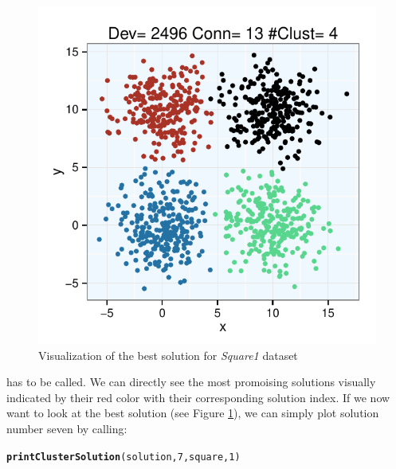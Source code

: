 \documentclass[parskip=half,DIV=14]{scrartcl}\usepackage[]{graphicx}\usepackage[]{color}
\makeatletter
\def\maxwidth{ %
  \ifdim\Gin@nat@width>\linewidth
    \linewidth
  \else
    \Gin@nat@width
  \fi
}
\newcommand{\hlnum}[1]{\textcolor[rgb]{0.686,0.059,0.569}{#1}}%
\newcommand{\hlstd}[1]{\textcolor[rgb]{0.345,0.345,0.345}{#1}}%
\newcommand{\hlkwd}[1]{\textcolor[rgb]{0.737,0.353,0.396}{\textbf{#1}}}%
\newenvironment{kframe}{%
 \def\at@end@of@kframe{}%
 \ifinner\ifhmode%
  \def\at@end@of@kframe{\end{minipage}}%
  \begin{minipage}{\columnwidth}%
 \fi\fi%
 \def\FrameCommand##1{\hskip\@totalleftmargin \hskip-\fboxsep
 \colorbox{shadecolor}{##1}\hskip-\fboxsep
     \hskip-\linewidth \hskip-\@totalleftmargin \hskip\columnwidth}%
 \MakeFramed {\advance\hsize-\width
   \@totalleftmargin\z@ \linewidth\hsize
   \@setminipage}}%
 {\par\unskip\endMakeFramed%
 \at@end@of@kframe}
\newenvironment{knitrout}{}{} %
\makeatother
\begin{document}
\begin{figure}
\begin{center}
\begin{knitrout}
\color{fgcolor}

{\centering \includegraphics[width=\maxwidth]{figures/plots-clusterSolutions-1} 

}



\end{knitrout}
\caption{Visualization of the best solution for \textit{Square1} dataset}
\label{fig:best}
\end{center}
\end{figure}
has to be called. We can directly see the most promoising solutions visually indicated by their red color with their corresponding solution index. If we now want to look at the best solution (see Figure \ref{fig:best}), we can simply plot solution number seven by calling:
\begin{knitrout}
\color{fgcolor}\begin{kframe}
\begin{alltt}
\hlkwd{printClusterSolution}\hlstd{(solution,}\hlnum{7}\hlstd{,square,}\hlnum{1}\hlstd{)}
\end{alltt}
\end{kframe}
\end{knitrout}
\end{document}
